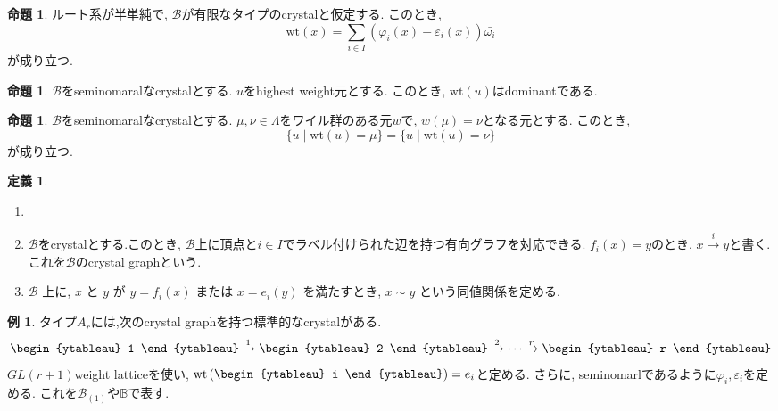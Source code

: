 \documentclass[a4,12pt, titlepage]{jarticle}
\theoremstyle{definition}
\newtheorem{df}{定義}
\newtheorem{prop}[thm]{命題}
\newtheorem*{ex}{例}
\begin{document}
\begin{prop}
  ルート系が半単純で, $\mathscr{B}$が有限なタイプのcrystalと仮定する. このとき,
  $$ \mathrm{wt}(x) = \sum_{ i \in I} (\varphi_i(x) - \varepsilon_i(x))\bar{\omega_i}$$
  が成り立つ.
\end{prop}

\begin{prop}
  $\mathscr{B}$をseminomaralなcrystalとする. $u$をhighest weight元とする. このとき, $\mathrm{wt}(u)$はdominantである.
\end{prop}

\begin{prop}
  $\mathscr{B}$をseminomaralなcrystalとする. $\mu, \nu \in \Lambda$をワイル群のある元$w$で, $w(\mu) = \nu$となる元とする.
  このとき,  
  \[
  \{ u \mid \mathrm{wt}(u) = \mu \} = \{ u \mid \mathrm{wt}(u) = \nu \}
  \]
  が成り立つ.
\end{prop}

\begin{df}
  \begin{enumerate}
    \item []
    \item $\mathscr{B}$をcrystalとする.このとき, $\mathscr{B}$上に頂点と$i \in I$でラベル付けられた辺を持つ有向グラフを対応できる. 
    $f_i(x) = y$のとき, $ x \xrightarrow{i} y$と書く.これを$\mathscr{B}$のcrystal graphという.
    \item $\mathscr{B}$ 上に, $x$ と $y$ が $y = f_i(x)$ または $x = e_i(y)$ を満たすとき, $x \sim y$ という同値関係を定める.
  \end{enumerate}
\end{df}

\begin{ex}
  タイプ$A_r$には,次のcrystal graphを持つ標準的なcrystalがある.
  $$\begin{ytableau} 1 \end{ytableau} \xrightarrow{1} \begin{ytableau} 2 \end{ytableau} \xrightarrow{2} \cdots \xrightarrow{r}
  \begin{ytableau} r \end{ytableau}$$
  $GL(r+1)$weight latticeを使い, $\mathrm{wt} \left( \vcenter{\hbox{\begin{ytableau} i \end{ytableau}}} \right) = e_i$と定める.
  さらに, seminomarlであるように$\varphi_i, \varepsilon_i$を定める. これを$\mathscr{B}_{(1)}$や$\mathbb{B}$で表す.
\end{ex}
\end{document}
